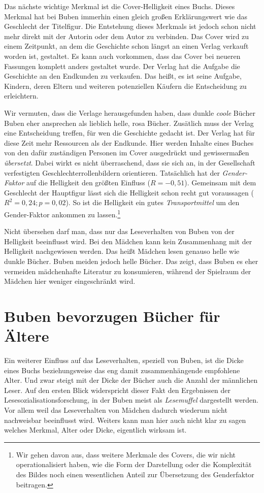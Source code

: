 Das nächste wichtige Merkmal ist die Cover-Helligkeit eines Buchs.
Dieses Merkmal hat bei Buben immerhin einen gleich großen Erklärungswert
wie das Geschlecht der Titelfigur. Die Entstehung dieses Merkmals ist
jedoch schon nicht mehr direkt mit der Autorin oder dem Autor zu
verbinden. Das Cover wird zu einem Zeitpunkt, an dem die Geschichte
schon längst an einen Verlag verkauft worden ist, gestaltet. Es kann
auch vorkommen, dass das Cover bei neueren Fassungen komplett anders
gestaltet wurde. Der Verlag hat die Aufgabe die Geschichte an den
Endkunden zu verkaufen. Das heißt, es ist seine Aufgabe, Kindern, deren
Eltern und weiteren potenziellen Käufern die Entscheidung zu
erleichtern.

Wir vermuten, dass die Verlage herausgefunden haben, dass dunkle
\emph{coole} Bücher Buben eher ansprechen als lieblich helle, rosa
Bücher. Zusätlich muss der Verlag eine Entscheidung treffen, für wen die
Geschichte gedacht ist. Der Verlag hat für diese Zeit mehr Ressourcen
als der Endkunde. Hier werden Inhalte eines Buches von den dafür
zuständigen Personen im Cover ausgedrückt und gewissermaßen
\emph{übersetzt}. Dabei wirkt es nicht überraschend, dass sie sich an,
in der Gesellschaft verfestigten Geschlechterrollenbildern orientieren.
Tatsächlich hat der \emph{Gender-Faktor} auf die Helligkeit den größten
Einfluss ($R=-0{,}51$). Gemeinsam mit dem Geschlecht der Hauptfigur
lässt sich die Helligkeit schon recht gut voraussagen
($R^2=0{,}24; p=0{,}02$). So ist die Helligkeit ein gutes
\emph{Transportmittel} um den Gender-Faktor ankommen zu
lassen.\footnote{Wir gehen davon aus, dass weitere Merkmale des Covers, die wir nicht operationalisiert haben, wie die Form der Darstellung oder die Komplexität des Bildes noch einen wesentlichen Anteil zur Übersetzung des Genderfaktor beitragen.}

Nicht übersehen darf man, dass nur das Leseverhalten von Buben von der
Helligkeit beeinflusst wird. Bei den Mädchen kann kein Zusammenhang mit
der Helligkeit nachgewiesen werden. Das heißt Mädchen lesen genauso
helle wie dunkle Bücher. Buben meiden jedoch helle Bücher. Das zeigt,
dass Buben es eher vermeiden mädchenhafte Literatur zu konsumieren,
während der Spielraum der Mädchen hier weniger eingeschränkt wird.

\section{Buben bevorzugen Bücher für Ältere}

Ein weiterer Einfluss auf das Leseverhalten, speziell von Buben, ist die
Dicke eines Buchs beziehungsweise das eng damit zusammenhängende
empfohlene Alter. Und zwar steigt mit der Dicke der Bücher auch die
Anzahl der männlichen Leser. Auf den ersten Blick widerspricht dieser
Fakt den Ergebnissen der Lesesozialisationsforschung, in der Buben meist
als \emph{Lesemuffel} dargestellt werden. Vor allem weil das
Leseverhalten von Mädchen dadurch wiederum nicht nachweisbar beeinflusst
wird. Weiters kann man hier auch nicht klar zu sagen welches Merkmal,
Alter oder Dicke, eigentlich wirksam ist.

